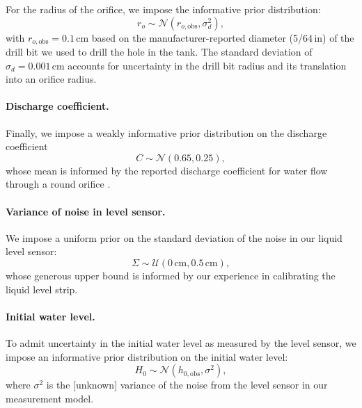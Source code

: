 \documentclass[openacc]{rsproca_new}%
\begin{document}
For the radius of the orifice, we impose the informative prior distribution:
\begin{equation}
r_o \sim \mathcal{N}(r_{o, \text{obs}}, \sigma_d^2), \label{eq:R_o_prior}
\end{equation}
with $r_{o, \text{obs}}=0.1$\,cm based on the manufacturer-reported diameter (5/64\,in) of the drill bit we used to drill the hole in the tank. The standard deviation of $\sigma_d= 0.001$\,cm accounts for uncertainty in the drill bit radius and its translation into an orifice radius.

\vspace{-\baselineskip}
\paragraph{Discharge coefficient.} 
Finally, we impose a weakly informative prior distribution on the discharge coefficient
\begin{equation}
	C \sim \mathcal{N}(0.65, 0.25),
\end{equation} whose mean is informed by the reported discharge coefficient for water flow through a round orifice \cite{hicks2014determining}. 

\vspace{-\baselineskip}
\paragraph{Variance of noise in level sensor.}  
We impose a uniform prior on the standard deviation of the noise in our liquid level sensor:
\begin{equation}
\Sigma \sim \mathcal{U}(0\,\text{cm}, 0.5\,\text{cm}),
\end{equation} whose generous upper bound is informed by our experience in calibrating the liquid level strip. 

\vspace{-\baselineskip}
\paragraph{Initial water level.} 
To admit uncertainty in the initial water level as measured by the level sensor, we impose an informative prior distribution on the initial water level:
\begin{equation}
	H_0 \sim \mathcal{N}(h_{0, \text{obs}}, \sigma^2),
\end{equation} where $\sigma^2$ is the [unknown] variance of the noise from the level sensor in our measurement model.
\end{document}

